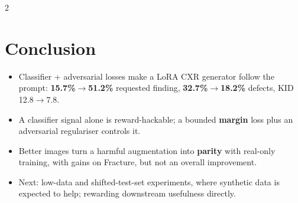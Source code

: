 \documentclass[a0,portrait]{a0poster}
\begin{document}
\begin{minipage}[c]{\linewidth}
\begin{framed}
\begin{multicols}{2}
\section*{Conclusion}
\begin{itemize}
	\item Classifier + adversarial losses make a LoRA CXR generator follow the prompt: \textbf{15.7\%$\to$51.2\%} requested finding, \textbf{32.7\%$\to$18.2\%} defects, KID 12.8$\to$7.8.
	\item A classifier signal alone is reward-hackable; a bounded \textbf{margin} loss plus an adversarial regulariser controls it.
	\item Better images turn a harmful augmentation into \textbf{parity} with real-only training, with gains on Fracture, but not an overall improvement.
	\item Next: low-data and shifted-test-set experiments, where synthetic data is expected to help; rewarding downstream usefulness directly.
\end{itemize}


\end{multicols}
\end{framed}
\end{minipage}
\end{document}
